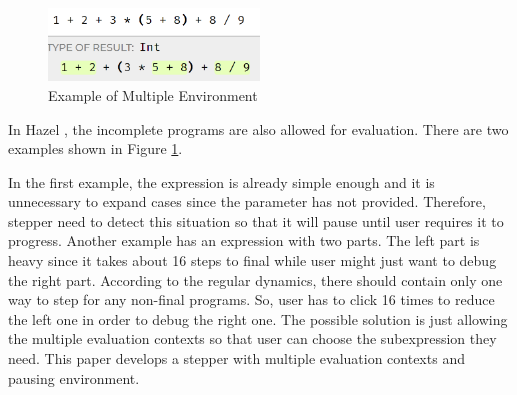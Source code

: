 \begin{figure}[htbp]
  \centering
  \includegraphics[width=0.5\textwidth]{img/multi_evaluation.png}
  \caption{Example of Multiple Environment}
  \label{fig:multiple}
\end{figure}


In Hazel , the incomplete programs are also allowed for evaluation.  There are two examples shown in Figure \ref{fig:multiple}.



In the first example, the expression is already simple enough and it is unnecessary to expand cases since the parameter has not provided. Therefore, stepper need to detect this situation so that it will pause until user requires it to progress. Another example has an expression with two parts. The left part is heavy since it takes about 16 steps to final while user might just want to debug the right part. According to the regular dynamics, there should contain only one way to step for any non-final programs. So, user has to click 16 times to reduce the left one in order to debug the right one. The possible solution is just allowing the multiple evaluation contexts so that user can choose the subexpression they need. This paper develops a stepper with multiple evaluation contexts and pausing environment.